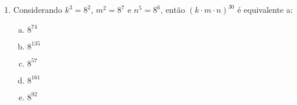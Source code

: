\documentclass[a4paper,14pt]{article}
\begin{document}
\begin{multicols}{2}
\begin{enumerate}
\begin{enumerate}[a)]
        \end{enumerate}
        \item Considerando $k^3 = 8^2$, $m^2 = 8^7$ e $n^5 = 8^6$, então $(k \cdot m \cdot n)^{30}$ é equivalente a:
        \begin{enumerate}[a)]
        	\item $8^{74}$
        	\item $8^{135}$
        	\item $8^{57}$
        	\item $8^{161}$
        	\item $8^{92}$
        \end{enumerate}
    $~$ \\ $~$ \\ $~$ \\ $~$ \\ $~$ \\ $~$ \\ $~$ \\ $~$ \\ $~$ \\ $~$ \\ $~$ \\ $~$ \\ $~$ \\ $~$ \\ $~$ \\ $~$ \\ $~$ \\ $~$ \\ $~$ \\ $~$ \\ $~$ \\ $~$ \\ $~$ \\ $~$ \\ $~$ \\ $~$ \\ $~$ \\ $~$ \\ $~$ \\ $~$
    \end{enumerate}        
    \end{multicols}
\end{document}
